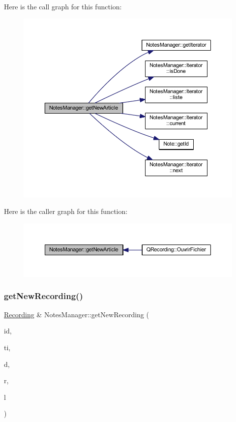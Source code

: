 Here is the call graph for this function\+:
\nopagebreak
\begin{figure}[H]
\begin{center}
\leavevmode
\includegraphics[width=350pt]{class_notes_manager_a44bfd4e7fe88b7f300a4be5589f92923_cgraph}
\end{center}
\end{figure}
Here is the caller graph for this function\+:
\nopagebreak
\begin{figure}[H]
\begin{center}
\leavevmode
\includegraphics[width=350pt]{class_notes_manager_a44bfd4e7fe88b7f300a4be5589f92923_icgraph}
\end{center}
\end{figure}
\mbox{\label{class_notes_manager_a71d0bc2e2716a4e558705ea76e3ad491}} 
\subsubsection{\texorpdfstring{get\+New\+Recording()}{getNewRecording()}}
{\footnotesize\ttfamily \hyperlink{class_recording}{Recording} \& Notes\+Manager\+::get\+New\+Recording (\begin{DoxyParamCaption}\item[{const Q\+String \&}]{id,  }\item[{const Q\+String \&}]{ti,  }\item[{const Q\+String \&}]{d,  }\item[{E\+N\+U\+M\+::\+Recording\+Type}]{r,  }\item[{Q\+String}]{l }\end{DoxyParamCaption})}



